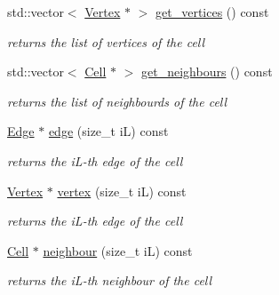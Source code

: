 \begin{DoxyCompactItemize}
\mbox{\label{classHArDCore2D_1_1Cell_a19a14fe5dd32fbf9d9557aaece6a0499}} 
std\+::vector$<$ \hyperlink{classHArDCore2D_1_1Vertex}{Vertex} $\ast$ $>$ \hyperlink{classHArDCore2D_1_1Cell_a19a14fe5dd32fbf9d9557aaece6a0499}{get\+\_\+vertices} () const
\begin{DoxyCompactList}\small\item\em returns the list of vertices of the cell \end{DoxyCompactList}\item 
\mbox{\label{classHArDCore2D_1_1Cell_a4d29dc1248424166380aa33d9ea7de3d}} 
std\+::vector$<$ \hyperlink{classHArDCore2D_1_1Cell}{Cell} $\ast$ $>$ \hyperlink{classHArDCore2D_1_1Cell_a4d29dc1248424166380aa33d9ea7de3d}{get\+\_\+neighbours} () const
\begin{DoxyCompactList}\small\item\em returns the list of neighbourds of the cell \end{DoxyCompactList}\item 
\mbox{\label{classHArDCore2D_1_1Cell_a85defed1382a8af8227e89f00434603e}} 
\hyperlink{classHArDCore2D_1_1Edge}{Edge} $\ast$ \hyperlink{classHArDCore2D_1_1Cell_a85defed1382a8af8227e89f00434603e}{edge} (size\+\_\+t iL) const
\begin{DoxyCompactList}\small\item\em returns the i\+L-\/th edge of the cell \end{DoxyCompactList}\item 
\mbox{\label{classHArDCore2D_1_1Cell_a2e6bcdeac17fd028ef3892e7866c7b88}} 
\hyperlink{classHArDCore2D_1_1Vertex}{Vertex} $\ast$ \hyperlink{classHArDCore2D_1_1Cell_a2e6bcdeac17fd028ef3892e7866c7b88}{vertex} (size\+\_\+t iL) const
\begin{DoxyCompactList}\small\item\em returns the i\+L-\/th edge of the cell \end{DoxyCompactList}\item 
\mbox{\label{classHArDCore2D_1_1Cell_adddfffa330938bd8ab624349722a0e4e}} 
\hyperlink{classHArDCore2D_1_1Cell}{Cell} $\ast$ \hyperlink{classHArDCore2D_1_1Cell_adddfffa330938bd8ab624349722a0e4e}{neighbour} (size\+\_\+t iL) const
\begin{DoxyCompactList}\small\item\em returns the i\+L-\/th neighbour of the cell \end{DoxyCompactList}\item 

\end{DoxyCompactItemize}

